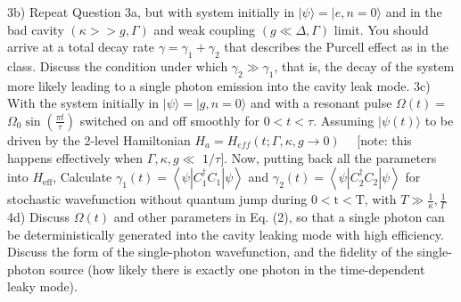 \documentclass[hyperref, a4paper]{article}
\begin{document}
3b) Repeat Question 3a, but with system initially in $|\psi\rangle=|e, n=0\rangle$ and in the bad cavity $(\kappa >> g, \Gamma)$ and weak coupling $(g \ll \Delta, \Gamma)$ limit. You should arrive at a total decay rate $\gamma=\gamma_{1}+\gamma_{2}$ that describes the Purcell effect as in the class. Discuss the condition under which $\gamma_{2} \gg \gamma_{1}$, that is, the decay of the system more likely leading to a single photon emission into the cavity leak mode.
3c) With the system initially in $|\psi\rangle=|g, n=0\rangle$ and with a resonant pulse $\Omega(t)=$ $\Omega_{0} \sin \left(\frac{\pi t}{\tau}\right)$ switched on and off smoothly for $0<t<\tau$. Assuming $|\psi(t)\rangle$ to be driven by the 2-level Hamiltonian $H_{a}=H_{e f f}(t ; \Gamma, \kappa, g \rightarrow 0) \quad$ [note: this happens effectively when $\Gamma, \kappa, g \ll$ $1 / \tau]$. Now, putting back all the parameters into $H_\text{eff}$, Calculate $\gamma_{1}(t)=\left\langle\psi\left|C_{1}^{\dagger} C_{1}\right| \psi\right\rangle$ and $\gamma_{2}(t)=\left\langle\psi\left|C_{2}^{\dagger} C_{2}\right| \psi\right\rangle$ for stochastic wavefunction without quantum jump during $0<\mathrm{t}<\mathrm{T}$, with $T \gg \frac{1}{\kappa}, \frac{1}{\Gamma}$
4d) Discuss $\Omega(t)$ and other parameters in Eq. (2), so that a single photon can be deterministically generated into the cavity leaking mode with high efficiency. Discuss the form of the single-photon wavefunction, and the fidelity of the single-photon source (how likely there is exactly one photon in the time-dependent leaky mode).
\end{document}
